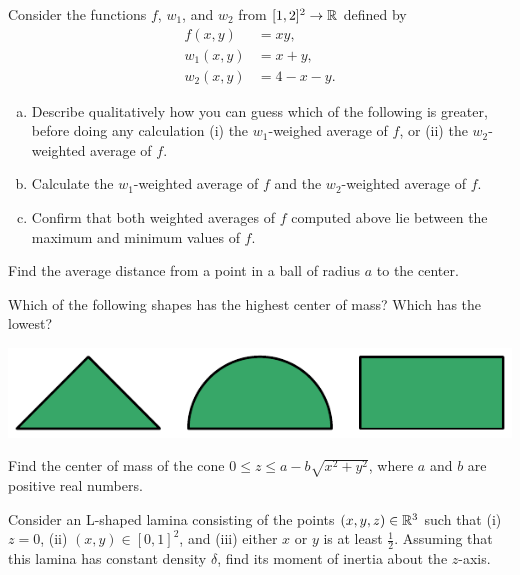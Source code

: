 \documentclass{watsonbook}
\begin{document}
\begin{aexercise}
  Consider the functions $f$, $w_1$, and $w_2$ from $[1,2]^2 \to \mathbb{R}$
  defined by
  \begin{align*}
    f(x,y) &= xy, \\
    w_1(x,y) &= x + y, \\
    w_2(x,y) &= 4-x-y. 
  \end{align*}
  \begin{enumerate}[(a),leftmargin=12pt,itemsep=6pt]
  \item \label{part:qual} Describe qualitatively how you can guess
  which of the following is greater, before doing any calculation
  (i) the $w_1$-weighed average of $f$, or (ii) the $w_2$-weighted
  average of $f$.
  
  \item \label{part:quant} Calculate the $w_1$-weighted average of
  $f$ and the $w_2$-weighted average of $f$.

  \item \label{ref:inequality} Confirm that both weighted averages
  of $f$ computed above lie between the maximum and minimum values of
  $f$.
\end{enumerate}
\end{aexercise}

\begin{aexercise}
  Find the average distance from a point in a ball of radius $a$ to
  the center. 
\end{aexercise}

\begin{aexercise} 
  Which of the following shapes has the highest center of mass? Which
  has the lowest? 
  \begin{center}
    \includegraphics{exercisefigures/centerofmassshapes} 
  \end{center}
\end{aexercise}

\begin{aexercise}
  Find the center of mass of the cone $0 \leq z \leq a - b\sqrt{x^2 +
    y^2}$, where $a$ and $b$ are positive real numbers. 
\end{aexercise}

\begin{aexercise} 
  Consider an L-shaped lamina consisting of the points
  $(x,y,z) \in \mathbb{R}^3$ such that (i) $z = 0$, (ii) $(x,y) \in [0,1]^2$, and
  (iii) either $x$ or $y$ is at least $\frac{1}{2}$. Assuming that
  this lamina has constant density $\delta$, find its moment of
  inertia about the $z$-axis. 
\end{aexercise}
\end{document}
